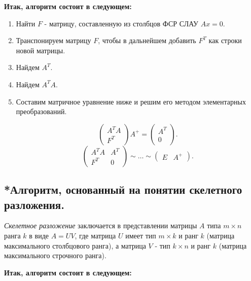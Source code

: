 \textbf{Итак, алгоритм состоит в следующем:}

\begin{enumerate}
    \item Найти $F$ - матрицу, составленную из столбцов ФСР СЛАУ $Ax = 0$.
    \item Транспонируем матрицу $F$, чтобы в дальнейшем добавить $F^T$ как строки новой матрицы.
    \item Найдем $A^T$.
    \item Найдем $A^TA$.
    \item Составим матричное уравнение ниже и решим его методом элементарных преобразований.

    \begin{equation*}
        \left(\begin{array}{c}
            A^TA \\
            F^T
        \end{array}\right)A^+
        =
        \left(\begin{array}{c}
            A^T \\
            0
        \end{array}\right)
    .\end{equation*}
    \begin{equation*}
        \left(\begin{array}{c|c}
            A^TA & A^T \\
            F^T & 0
        \end{array}\right)
        \sim \ldots \sim
        \left(\begin{array}{c|c}
            E & A^+
        \end{array}\right)
    .\end{equation*}
\end{enumerate}


\newpage

\subsection{
    *Алгоритм, основанный на понятии скелетного разложения.
}

\textit{Скелетное разложение} заключается в представлении матрицы $A$ типа $m \times n$ ранга $k$ в виде $A = UV$, где матрица $U$ имеет тип $m \times k$ и ранг $k$ (матрица максимального столбцового ранга), а матрица $V$ - тип $k \times n$ и ранг $k$ (матрица максимального строчного ранга).

\textbf{Итак, алгоритм состоит в следующем:}


